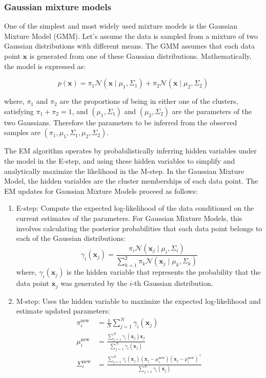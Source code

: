 \subsubsection{Gaussian mixture models}

One of the simplest and most widely used mixture models is the Gaussian Mixture Model (GMM). Let's assume the data is sampled from a mixture of two Gaussian distributions with different means. The GMM assumes that each data point $\mathbf{x}$ is generated from one of these Gaussian distributions. Mathematically, the model is expressed as:

\begin{equation}
p(\mathbf{x}) = \pi_1 \mathcal{N}(\mathbf{x} \mid \mu_1, \Sigma_1) + \pi_2 \mathcal{N}(\mathbf{x} \mid \mu_2, \Sigma_2)
\end{equation}

where, $\pi_1$ and $\pi_2$ are the proportions of being in either one of the clusters, satisfying $\pi_1 + \pi_2 = 1$, and $(\mu_1, \Sigma_1)$ and $(\mu_2, \Sigma_2)$ are the parameters of the two Gaussians. Therefore the parameters to be inferred from the observed samples are $(\pi_1, \mu_1, \Sigma_1, \mu_2, \Sigma_2)$. 

The EM algorithm operates by probabilistically inferring hidden variables under the model in the E-step, and using these hidden variables to simplify and analytically maximize the likelihood in the M-step. In the Gaussian Mixture Model, the hidden variables are the cluster memberships of each data point. The EM updates for Gaussian Mixture Models proceed as follows:

\begin{enumerate}
    \item E-step: Compute the expected log-likelihood of the data conditioned on the current estimates of the parameters. For Gaussian Mixture Models, this involves calculating the posterior probabilities that each data point belongs to each of the Gaussian distributions:
    \begin{equation}
        \gamma_{i}(\mathbf{x}_j) = \frac{\pi_i \mathcal{N}(\mathbf{x}_j \mid \mu_i, \Sigma_i)}{\sum_{k=1}^{2} \pi_k \mathcal{N}(\mathbf{x}_j \mid \mu_k, \Sigma_k)}
    \end{equation}
    where, $\gamma_{i}(\mathbf{x}_j)$ is the hidden variable that represents the probability that the data point $\mathbf{x}_j$ was generated by the $i$-th Gaussian distribution. 
    \item M-step: Uses the hidden variable to maximize the expected log-likelihood and estimate updated parameters:
    \begin{align}
        \pi_i^{\text{new}} &= \frac{1}{N} \sum_{j=1}^{N} \gamma_{i}(\mathbf{x}_j)  \nonumber \\
        \mu_i^{\text{new}} &= \frac{\sum_{j=1}^{N} \gamma_{i}(\mathbf{x}_j) \mathbf{x}_j}{\sum_{j=1}^{N} \gamma_{i}(\mathbf{x}_j)} \nonumber \\
        \Sigma_i^{\text{new}} &= \frac{\sum_{j=1}^{N} \gamma_{i}(\mathbf{x}_j) (\mathbf{x}_j - \mu_i^{\text{new}})(\mathbf{x}_j - \mu_i^{\text{new}})^\top}{\sum_{j=1}^{N} \gamma_{i}(\mathbf{x}_j)}
    \end{align}
\end{enumerate}

